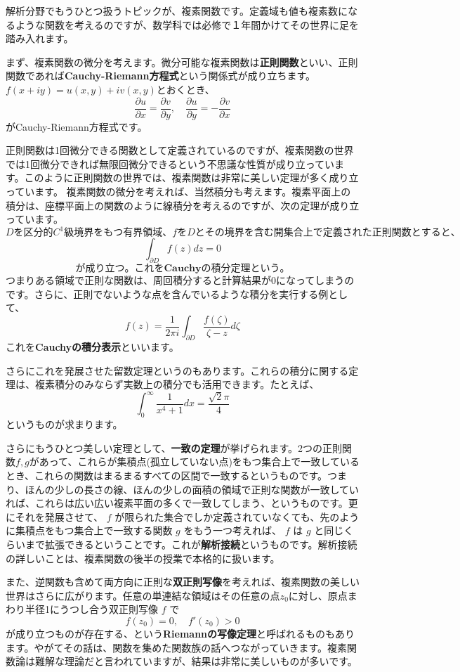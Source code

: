 解析分野でもうひとつ扱うトピックが、複素関数です。定義域も値も複素数になるような関数を考えるのですが、数学科では必修で１年間かけてその世界に足を踏み入れます。

まず、複素関数の微分を考えます。微分可能な複素関数は\textbf{正則関数}といい、正則関数であれば\textbf{Cauchy-Riemann方程式}という関係式が成り立ちます。$f(x+iy)=u(x,y)+iv(x,y)$とおくとき、
\[
\frac{\partial u}{\partial x} = \frac{\partial v}{\partial y},\quad
\frac{\partial u}{\partial y} = -\frac{\partial v}{\partial x}
\]
がCauchy-Riemann方程式です。

正則関数は1回微分できる関数として定義されているのですが、複素関数の世界では1回微分できれば無限回微分できるという不思議な性質が成り立っています。このように正則関数の世界では、複素関数は非常に美しい定理が多く成り立っています。
複素関数の微分を考えれば、当然積分も考えます。複素平面上の積分は、座標平面上の関数のように線積分を考えるのですが、次の定理が成り立っています。
\[
Dを区分的C^1級境界をもつ有界領域、fをDとその境界を含む開集合上で定義された正則関数とすると、
\]
\[
\int_{\partial D} f(z) dz = 0
\]
\[
が成り立つ。これを\textbf{Cauchyの積分定理}という。
\]
つまりある領域で正則な関数は、周回積分すると計算結果が0になってしまうのです。さらに、正則でないような点を含んでいるような積分を実行する例として、
\[
f(z) = \frac{1}{2 \pi i} \int_{\partial D} {\frac{f(\zeta)}{\zeta - z}} d\zeta
\]
これを\textbf{Cauchyの積分表示}といいます。

さらにこれを発展させた留数定理というのもあります。これらの積分に関する定理は、複素積分のみならず実数上の積分でも活用できます。たとえば、
\[
\int_0^{\infty} \frac{1}{x^4 + 1}dx = \frac{\sqrt{2}\pi}{4}
\]
というものが求まります。

さらにもうひとつ美しい定理として、\textbf{一致の定理}が挙げられます。2つの正則関数$f,g$があって、これらが集積点(孤立していない点)をもつ集合上で一致しているとき、これらの関数はまるまるすべての区間で一致するというものです。つまり、ほんの少しの長さの線、ほんの少しの面積の領域で正則な関数が一致していれば、これらは広い広い複素平面の多くで一致してしまう、というものです。更にそれを発展させて、 $f$ が限られた集合でしか定義されていなくても、先のように集積点をもつ集合上で一致する関数 $g$ をもう一つ考えれば、 $f$ は $g$ と同じくらいまで拡張できるということです。これが\textbf{解析接続}というものです。解析接続の詳しいことは、複素関数の後半の授業で本格的に扱います。

また、逆関数も含めて両方向に正則な\textbf{双正則写像}を考えれば、複素関数の美しい世界はさらに広がります。任意の単連結な領域はその任意の点$z_0$に対し、原点まわり半径1にうつし合う双正則写像 $f$ で
\[
f(z_0) = 0, \quad f'(z_0) > 0
\]
が成り立つものが存在する、という\textbf{Riemannの写像定理}と呼ばれるものもあります。やがてその話は、関数を集めた関数族の話へつながっていきます。複素関数論は難解な理論だと言われていますが、結果は非常に美しいものが多いです。
